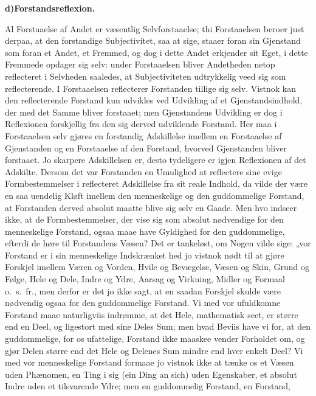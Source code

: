 \documentclass[12pt]{book}
\newcommand{\opage}[1]{\marginnote{\footnotesize\textit{[#1]}}}
\begin{document}
\begin{center}
{\bfseries d)\quad Forstandsreflexion.}
\end{center}

Al Forstaaelse af Andet er væsentlig Selvforstaaelse; thi Forstaaelsen beroer just
derpaa, at den forstandige Subjectivitet, saa at sige, staaer foran sin Gjenstand
som foran et Andet, et Fremmed, og dog i dette Andet erkjender sit Eget, i dette
Fremmede opdager sig selv: under Forstaaelsen bliver Andetheden netop reflecteret i
Selvheden saaledes, at Subjectiviteten udtrykkelig veed sig som reflecterende. I
Forstaaelsen reflecterer Forstanden tillige sig selv. Vistnok kan den
reflecterende Forstand kun udvikles ved Udvikling af et Gjenstandsindhold, der med
det Samme bliver forstaaet; men Gjenstandens Udvikling er dog i Reflexionen
forskjellig fra den sig derved udviklende Forstand. Her maa i Forstaaelsen selv
gjøres en forstandig Adskillelse imellem en Forstaaelse af Gjenstanden og en
Forstaaelse af den Forstand, hvorved Gjenstanden bliver forstaaet. Jo skarpere
Adskillelsen er, desto tydeligere er igjen Reflexionen af det Adskilte. Dersom det
var Forstanden en Umulighed at reflectere sine evige Formbestemmelser i reflecteret
Adskillelse fra sit reale Indhold, da vilde der være en saa uendelig Kløft imellem
den menneskelige og den guddommelige Forstand, at Forstanden derved absolut maatte
blive sig selv en Gaade. Men hvo indseer ikke, at de Formbestemmelser, der vise
sig som absolut nødvendige for den menneskelige Forstand, ogsaa maae have
Gyldighed for den guddommelige, efterdi de høre til Forstandens Væsen? Det er
tankeløst, om Nogen vilde sige: „vor Forstand er i sin menneskelige Indskrænket%
\opage{61} hed jo vistnok nødt til at gjøre Forskjel imellem Væren og Vorden, Hvile og
Bevægelse, Væsen og Skin, Grund og Følge, Hele og Dele, Indre og Ydre, Aarsag og
Virkning, Midler og Formaal o.~s.~fr., men derfor er det jo ikke sagt, at en
saadan Forskjel skulde være nødvendig ogsaa for den guddommelige Forstand. Vi med
vor ufuldkomne Forstand maae naturligviis indrømme, at det Hele, mathematisk seet,
er større end en Deel, og ligestort med sine Deles Sum; men hvad Beviis have vi
for, at den guddommelige, for os ufattelige, Forstand ikke maaskee vender
Forholdet om, og gjør Delen større end det Hele og Delenes Sum mindre end hver
enkelt Deel? Vi med vor menneskelige Forstand formaae jo vistnok ikke at tænke os
et Væsen uden Phænomen, en Ting i sig (ein Ding an sich) uden Egenskaber, et
absolut Indre uden et tilsvarende Ydre; men en guddommelig Forstand, en Forstand,
\end{document}
